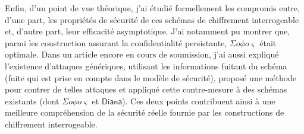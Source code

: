 \documentclass[a4]{article}
\newcommand{\sophos}{{\Sigma o\phi o\varsigma}}
\newcommand{\diana}{\ensuremath{\mathsf{Diana}}}
\begin{document}
Enfin, d'un point de vue théorique, j'ai étudié formellement les compromis entre, d'une part, les propriétés de sécurité de ces schémas de chiffrement interrogeable et, d'autre part, leur efficacité asymptotique.
J'ai notamment pu montrer que, parmi les construction assurant la confidentialité persistante, $\sophos$ était optimale.
Dans un article encore en cours de soumission, j'ai aussi expliqué l'existence d'attaques génériques, utilisant les informations fuitant du schéma (fuite qui est prise en compte dans le modèle de sécurité), proposé une méthode pour contrer de telles attaques et appliqué cette contre-mesure à des schémas existants (dont $\sophos$ et $\diana$).
Ces deux points contribuent ainsi à une meilleure compréhension de la sécurité réelle fournie par les constructions de chiffrement interrogeable.
\end{document}
